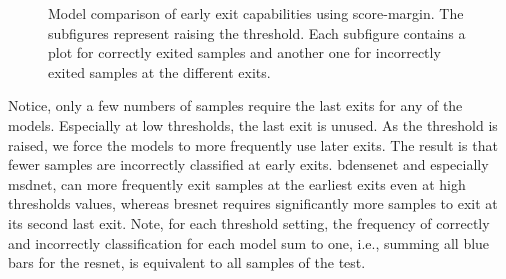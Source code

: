 \begin{minipage}{\linewidth}
\begin{figure}
		\hfill
		\hfill
		\hfill
		\hfill
		
		\caption[Model comparison of early exit capabilities]{Model comparison of early exit capabilities using score-margin. The subfigures represent raising the threshold. Each subfigure contains a plot for correctly exited samples and another one for incorrectly exited samples at the different exits. }
		\label{fig:model_threshold_comparison}
	\end{figure}
	
\end{minipage}

Notice, only a few numbers of samples require the last exits for any of the models. Especially at low thresholds, the last exit is unused. As the threshold is raised, we force the models to more frequently use later exits. The result is that fewer samples are incorrectly classified at early exits. \gls{bdensenet} and especially \gls{msdnet}, can more frequently exit samples at the earliest exits even at high thresholds values, whereas \gls{bresnet} requires significantly more samples to exit at its second last exit.
Note, for each threshold setting, the frequency of correctly and incorrectly classification for each model sum to one, i.e., summing all blue bars for the \gls{resnet}, is equivalent to all samples of the test.

